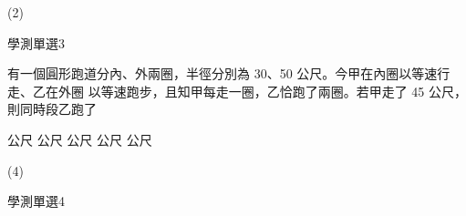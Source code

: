 \begin{QUESTIONS}
\begin{QUESTION}
        \begin{QFROMS}
        \end{QFROMS}
        \begin{QTAGS}\end{QTAGS}
        \begin{QANS}
            (2)
        \end{QANS}
        \begin{QSOLLIST}
        \end{QSOLLIST}
        \begin{QEMPTYSPACE}
        \end{QEMPTYSPACE}
    \end{QUESTION}
    \begin{QUESTION}
        \begin{ExamInfo}{97}{學測}{單選}{3}
        \end{ExamInfo}
        \begin{ExamAnsRateInfo}{73}{97}{84}{38}
        \end{ExamAnsRateInfo}
        \begin{QBODY}
            有一個圓形跑道分內、外兩圈，半徑分別為 30、50 公尺。今甲在內圈以等速行走、乙在外圈 以等速跑步，且知甲每走一圈，乙恰跑了兩圈。若甲走了 45 公尺，則同時段乙跑了 \\
			\begin{QOPSINONELINE} 
				 公尺  公尺  公尺  公尺  公尺
			\end{QOPSINONELINE}
        \end{QBODY}
        \begin{QFROMS}
        \end{QFROMS}
        \begin{QTAGS}\end{QTAGS}
        \begin{QANS}
            (4)
        \end{QANS}
        \begin{QSOLLIST}
        \end{QSOLLIST}
        \begin{QEMPTYSPACE}
        \end{QEMPTYSPACE}
    \end{QUESTION}
    \begin{QUESTION}
        \begin{ExamInfo}{97}{學測}{單選}{4}
        \end{ExamInfo}
        \begin{ExamAnsRateInfo}{39}{69}{31}{17}

\end{ExamAnsRateInfo}
\end{QUESTION}
\end{QUESTIONS}
